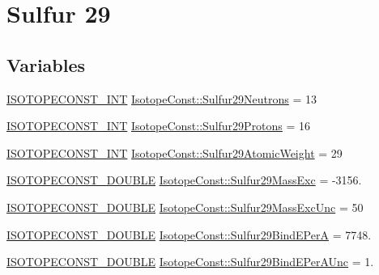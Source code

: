 \hypertarget{group___isotope_const-_sulfur-_s29}{}\section{Sulfur 29}
\label{group___isotope_const-_sulfur-_s29}
\subsection*{Variables}
\begin{DoxyCompactItemize}
\item 
\mbox{\hyperlink{group___isotope_const-_macros_ga5f18360b3e99483a35c32d789e62621c}{I\+S\+O\+T\+O\+P\+E\+C\+O\+N\+S\+T\+\_\+\+I\+NT}} \mbox{\hyperlink{group___isotope_const-_sulfur-_s29_ga50c6f14f00f163d9d4504c7d4836220d}{Isotope\+Const\+::\+Sulfur29\+Neutrons}} = 13
\item 
\mbox{\hyperlink{group___isotope_const-_macros_ga5f18360b3e99483a35c32d789e62621c}{I\+S\+O\+T\+O\+P\+E\+C\+O\+N\+S\+T\+\_\+\+I\+NT}} \mbox{\hyperlink{group___isotope_const-_sulfur-_s29_gabb9d28135664a659949e7bc14ae9e775}{Isotope\+Const\+::\+Sulfur29\+Protons}} = 16
\item 
\mbox{\hyperlink{group___isotope_const-_macros_ga5f18360b3e99483a35c32d789e62621c}{I\+S\+O\+T\+O\+P\+E\+C\+O\+N\+S\+T\+\_\+\+I\+NT}} \mbox{\hyperlink{group___isotope_const-_sulfur-_s29_ga6b56df385390b0bcc94ae4f94f64022f}{Isotope\+Const\+::\+Sulfur29\+Atomic\+Weight}} = 29
\item 
\mbox{\hyperlink{group___isotope_const-_macros_ga8f45a7272ce02c0b4c65c44636ed719a}{I\+S\+O\+T\+O\+P\+E\+C\+O\+N\+S\+T\+\_\+\+D\+O\+U\+B\+LE}} \mbox{\hyperlink{group___isotope_const-_sulfur-_s29_ga114ae4b97b6d8b4f87635fde53054e72}{Isotope\+Const\+::\+Sulfur29\+Mass\+Exc}} = -\/3156.
\item 
\mbox{\hyperlink{group___isotope_const-_macros_ga8f45a7272ce02c0b4c65c44636ed719a}{I\+S\+O\+T\+O\+P\+E\+C\+O\+N\+S\+T\+\_\+\+D\+O\+U\+B\+LE}} \mbox{\hyperlink{group___isotope_const-_sulfur-_s29_ga7ad037efc9da4d964c81a432a85d534c}{Isotope\+Const\+::\+Sulfur29\+Mass\+Exc\+Unc}} = 50
\item 
\mbox{\hyperlink{group___isotope_const-_macros_ga8f45a7272ce02c0b4c65c44636ed719a}{I\+S\+O\+T\+O\+P\+E\+C\+O\+N\+S\+T\+\_\+\+D\+O\+U\+B\+LE}} \mbox{\hyperlink{group___isotope_const-_sulfur-_s29_gaeea8afc8769252a604188e1648e469c7}{Isotope\+Const\+::\+Sulfur29\+Bind\+E\+PerA}} = 7748.
\item 
\mbox{\hyperlink{group___isotope_const-_macros_ga8f45a7272ce02c0b4c65c44636ed719a}{I\+S\+O\+T\+O\+P\+E\+C\+O\+N\+S\+T\+\_\+\+D\+O\+U\+B\+LE}} \mbox{\hyperlink{group___isotope_const-_sulfur-_s29_gaeecbf1f4280450140afec769d498f53f}{Isotope\+Const\+::\+Sulfur29\+Bind\+E\+Per\+A\+Unc}} = 1.

\end{DoxyCompactItemize}
